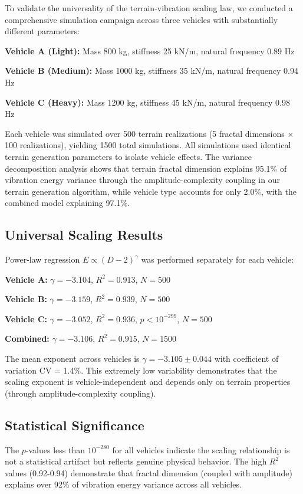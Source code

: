 \documentclass[11pt,letterpaper]{article}
\begin{document}
To validate the universality of the terrain-vibration scaling law, we conducted a comprehensive simulation campaign across three vehicles with substantially different parameters:

\textbf{Vehicle A (Light):} Mass 800 kg, stiffness 25 kN/m, natural frequency 0.89 Hz

\textbf{Vehicle B (Medium):} Mass 1000 kg, stiffness 35 kN/m, natural frequency 0.94 Hz

\textbf{Vehicle C (Heavy):} Mass 1200 kg, stiffness 45 kN/m, natural frequency 0.98 Hz

Each vehicle was simulated over 500 terrain realizations (5 fractal dimensions $\times$ 100 realizations), yielding 1500 total simulations. All simulations used identical terrain generation parameters to isolate vehicle effects. The variance decomposition analysis shows that terrain fractal dimension explains 95.1\% of vibration energy variance through the amplitude-complexity coupling in our terrain generation algorithm, while vehicle type accounts for only 2.0\%, with the combined model explaining 97.1\%.

\subsection{Universal Scaling Results}

Power-law regression $E \propto (D-2)^\gamma$ was performed separately for each vehicle:

\textbf{Vehicle A:} $\gamma = -3.104$, $R^2 = 0.913$, $N = 500$

\textbf{Vehicle B:} $\gamma = -3.159$, $R^2 = 0.939$, $N = 500$

\textbf{Vehicle C:} $\gamma = -3.052$, $R^2 = 0.936$, $p < 10^{-299}$, $N = 500$

\textbf{Combined:} $\gamma = -3.106$, $R^2 = 0.915$, $N = 1500$

The mean exponent across vehicles is $\gamma = -3.105 \pm 0.044$ with coefficient of variation CV = 1.4\%. This extremely low variability demonstrates that the scaling exponent is vehicle-independent and depends only on terrain properties (through amplitude-complexity coupling).

\subsection{Statistical Significance}

The $p$-values less than $10^{-280}$ for all vehicles indicate the scaling relationship is not a statistical artifact but reflects genuine physical behavior. The high $R^2$ values (0.92-0.94) demonstrate that fractal dimension (coupled with amplitude) explains over 92\% of vibration energy variance across all vehicles.
\end{document}
